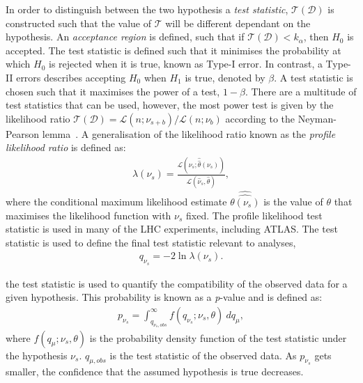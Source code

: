 In order to distinguish between the two hypothesis a \emph{test statistic}, $\mathcal{T}(\mathcal{D})$ is constructed such that the value of $\mathcal{T}$ will be different dependant on the hypothesis. An \emph{acceptance region} is defined, such that if $\mathcal{T}(\mathcal{D}) < k_\alpha$, then $H_0$ is accepted. The test statistic is defined such that it minimises the probability at which $H_0$ is rejected when it is true, known as Type-I error. In contrast, a Type-II errors describes accepting $H_0$ when $H_1$ is true, denoted by $\beta$. A test statistic is chosen such that it maximises the power of a test, $1-\beta$. There are a multitude of test statistics that can be used, however, the most power test is given by the likelihood ratio $\mathcal{T}(\mathcal{D}) = \mathcal{L}(n;\nu_{s+b})/\mathcal{L}(n;\nu_{b})$ according to the Neyman-Pearson lemma~\cite{Cowan1998}. A generalisation of the likelihood ratio known as the \emph{profile likelihood ratio} is defined as:
\begin{equation}
    \label{eq:profLL}
    \begin{aligned}
        \lambda(\nu_s) = \frac{\mathcal{L}(\nu_s;\hat{\hat{\theta}}(\nu_s))}{\mathcal{L}(\hat{\nu}_s,\hat{\theta})},
    \end{aligned}
\end{equation}
where the conditional maximum likelihood estimate $\hat{\hat{\theta(\nu_s)}}$ is the value of $\theta$ that maximises the likelihood function with $\nu_s$ fixed. The profile likelihood test statistic is used in many of the LHC experiments, including ATLAS. The test statistic is used to define the final test statistic relevant to analyses,
\begin{equation}
    \label{eq:teststat}
    \begin{aligned}
        q_{\nu_s} = -2\ln\lambda(\nu_s).
    \end{aligned}
\end{equation}

the test statistic is used to quantify the compatibility of the observed data for a given hypothesis. This probability is known as a \emph{p}-value and is defined as:
\begin{equation}
    \label{eq:pvalue}
    \begin{aligned}
        p_{\nu_s} = \int_{q_{\nu_{s},obs}}^\infty f(q_{\nu_s};\nu_s,\theta)~dq_\mu,
    \end{aligned}
\end{equation}
where $f(q_\mu;\nu_s,\theta)$ is the probability density function of the test statistic under the hypothesis $\nu_s$. $q_{\mu,obs}$ is the test statistic of the observed data. As $p_{\nu_s}$ gets smaller, the confidence that the assumed hypothesis is true decreases. 

